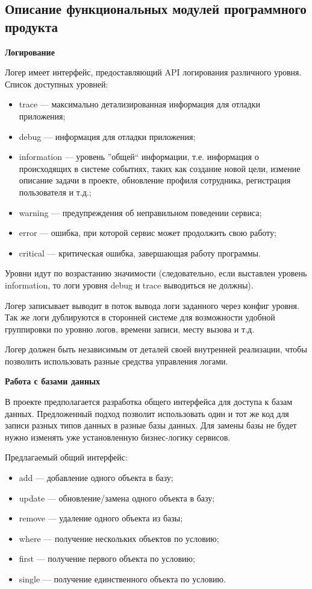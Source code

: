 \subsection{Описание функциональных модулей программного продукта}\label{sec:domain:func}

\textbf{Логирование}

Логер имеет интерфейс, предоставляющий API логирования различного уровня. Список доступных уровней:

\begin{itemize}
    \item trace — максимально детализированная информация для отладки приложения;
    \item debug — информация для отладки приложения;
    \item information  — уровень ''общей`` информации, т.е. информация о происходящих в системе событиях, таких как создание новой цели, измение описание задачи в проекте, обновление профиля сотрудника, регистрация пользователя и т.д.;
    \item warning  — предупреждения об неправильном поведении сервиса;
    \item error — ошибка, при которой сервис может продолжить свою работу;
    \item critical  — критическая ошибка, завершающая работу программы.
\end{itemize}

Уровни идут по возрастанию значимости (следовательно, если выставлен уровень information, то логи уровня debug и trace выводиться не должны).

Логер записывает выводит в поток вывода логи заданного через конфиг уровня. Так же логи дублируются в сторонней системе для возможности удобной группировки по уровню логов, времени записи, месту вызова и т.д.

Логер должен быть независимым от деталей своей внутренней реализации, чтобы позволить использовать разные средства управления логами.

\bigskip
\textbf{Работа с базами данных}

В проекте предполагается разработка общего интерфейса для доступа к базам данных. Предложенный подход позволит использовать один и тот же код для записи разных типов данных в разные базы данных. Для замены базы не будет нужно изменять уже установленную бизнес-логику сервисов.

Предлагаемый общий интерфейс:
\begin{itemize}
	\item add — добавление одного объекта в базу;
	\item update — обновление/замена одного объекта в базу;
	\item remove — удаление одного объекта из базы;
	\item where — получение нескольких объектов по условию;
	\item first — получение первого объекта по условию;
	\item single — получение единственного объекта по условию.
\end{itemize}

